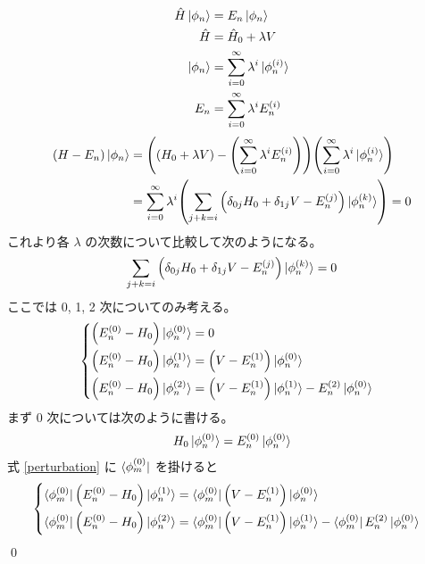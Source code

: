 \documentclass[uplatex,dvipdfmx,a4paper,11pt]{jlreq}
\makeatletter
\theoremstyle{definition}
\renewenvironment{proof}[1][\proofname]{\par
  \normalfont
  \topsep6\p@\@plus6\p@ \trivlist
  \item[\hskip\labelsep{\bfseries #1}\@addpunct{\bfseries}]\ignorespaces\quad\par
}{%
  \qed\endtrivlist\@endpefalse
}
\renewcommand\proofname{証明}
\makeatother
\begin{document}
\begin{proof}
  \begin{align}
    \hat{H}\ket{\phi_n} & = E_n\ket{\phi_n}                                  \\
    \hat{H}             & = \hat{H}_0 + \lambda V                            \\
    \ket{\phi_n}        & = \sum_{i = 0}^{\infty}\lambda^i\ket{\phi_n^{(i)}} \\
    E_n                 & = \sum_{i = 0}^{\infty}\lambda^iE_n^{(i)}
  \end{align}
  \begin{align}
    (H - E_n)\ket{\phi_n} & = \qty(\qty(H_0 + \lambda V) - \qty(\sum_{i = 0}^{\infty}\lambda^iE_n^{(i)}))\qty(\sum_{i = 0}^{\infty}\lambda^i\ket{\phi_n^{(i)}}) \\
                          & = \sum_{i = 0}^{\infty}\lambda^i\qty(\sum_{j+k=i}\qty(\delta_{0j}H_0 + \delta_{1j}V - E_n^{(j)})\ket{\phi_n^{(k)}}) = 0
  \end{align}
  これより各 $\lambda$ の次数について比較して次のようになる。
  \begin{align}
    \sum_{j+k=i}\qty(\delta_{0j}H_0 + \delta_{1j}V - E_n^{(j)})\ket{\phi_n^{(k)}} = 0
  \end{align}
  ここでは 0, 1, 2 次についてのみ考える。
  \begin{align}
     & \begin{dcases}
         \qty(E_n^{(0)} - H_0)\ket{\phi_n^{(0)}} = 0                                     \\
         \qty(E_n^{(0)} - H_0)\ket{\phi_n^{(1)}} = \qty(V - E_n^{(1)})\ket{\phi_n^{(0)}} \\
         \qty(E_n^{(0)} - H_0)\ket{\phi_n^{(2)}} = \qty(V - E_n^{(1)})\ket{\phi_n^{(1)}} - E_n^{(2)}\ket{\phi_n^{(0)}}
       \end{dcases}\label{perturbation}
  \end{align}
  まず 0 次については次のように書ける。
  \begin{align}
    H_0\ket{\phi_n^{(0)}} = E_n^{(0)}\ket{\phi_n^{(0)}}
  \end{align}
  式 \eqref{perturbation} に $\bra{\phi_m^{(0)}}$ を掛けると
  \begin{align}
         & \begin{dcases}
             \bra{\phi_m^{(0)}}\qty(E_n^{(0)} - H_0)\ket{\phi_n^{(1)}} = \bra{\phi_m^{(0)}}\qty(V - E_n^{(1)})\ket{\phi_n^{(0)}} \\
             \bra{\phi_m^{(0)}}\qty(E_n^{(0)} - H_0)\ket{\phi_n^{(2)}} = \bra{\phi_m^{(0)}}\qty(V - E_n^{(1)})\ket{\phi_n^{(1)}} - \bra{\phi_m^{(0)}}E_n^{(2)}\ket{\phi_n^{(0)}}

\end{dcases}
\end{align}
\end{proof}
\end{document}
